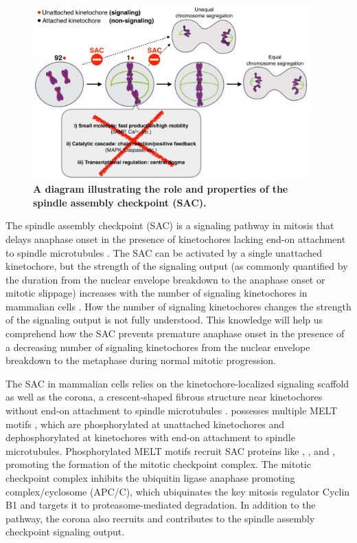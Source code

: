 
\begin{figure}
    \centering
    \includegraphics[width=0.95\textwidth]{chapters/figures/SACRole.pdf}
    \caption{\textbf{A diagram illustrating the role and properties of the spindle assembly checkpoint (SAC).}}
    \label{SACRole}
\end{figure}


The spindle assembly checkpoint (SAC) is a signaling pathway in mitosis that delays anaphase onset in the presence of kinetochores lacking end-on attachment to spindle microtubules \cite{LateralAttachmentSAC}. The SAC can be activated by a single unattached kinetochore, but the strength of the signaling output (as commonly quantified by the duration from the nuclear envelope breakdown to the anaphase onset or mitotic slippage) increases with the number of signaling kinetochores in mammalian cells \cite{RiederNormalProgression,Rheostat,Ablation}. How the number of signaling kinetochores changes the strength of the signaling output is not fully understood. This knowledge will help us comprehend how the SAC prevents premature anaphase onset in the presence of a decreasing number of signaling kinetochores from the nuclear envelope breakdown to the metaphase during normal mitotic progression.

The SAC in mammalian cells relies on the kinetochore-localized signaling scaffold  as well as the corona, a crescent-shaped fibrous structure near kinetochores without end-on attachment to spindle microtubules \cite{GSK923295LateralAttachmentEM,CoronaActivatesSAC}.  possesses multiple MELT motifs \cite{MELTEvolution}, which are phosphorylated at unattached kinetochores and dephosphorylated at kinetochores with end-on attachment to spindle microtubules. Phosphorylated MELT motifs recruit SAC proteins like , , and , promoting the formation of the mitotic checkpoint complex. The mitotic checkpoint complex inhibits the ubiquitin ligase anaphase promoting complex/cyclosome (APC/C), which ubiquinates the key mitosis regulator Cyclin B1 and targets it to proteasome-mediated degradation. In addition to the  pathway, the corona also recruits  and contributes to the spindle assembly checkpoint signaling output.

